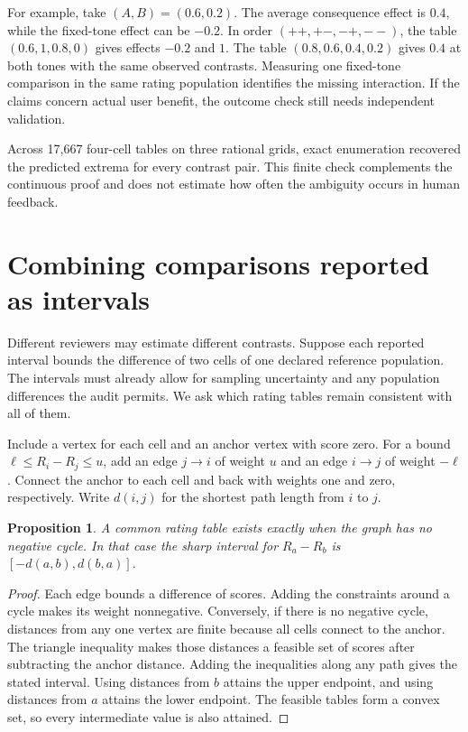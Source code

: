 \documentclass[11pt]{article}
\newtheorem{proposition}{Proposition}
\begin{document}
For example, take $(A,B)=(0.6,0.2)$. The average consequence
effect is $0.4$, while the fixed-tone effect can be $-0.2$.
In order $(++,+-,-+,--)$, the table $(0.6,1,0.8,0)$ gives
effects $-0.2$ and $1$. The table $(0.8,0.6,0.4,0.2)$ gives
$0.4$ at both tones with the same observed contrasts. Measuring
one fixed-tone comparison in the same rating population identifies
the missing interaction. If the claims concern actual user benefit,
the outcome check still needs independent validation.

Across 17,667 four-cell tables on three rational grids, exact
enumeration recovered the predicted extrema for every contrast
pair. This finite check complements the continuous proof and
does not estimate how often the ambiguity occurs in human feedback.

\section{Combining comparisons reported as intervals}
Different reviewers may estimate different contrasts. Suppose each
reported interval bounds the difference of two cells of one declared
reference population. The intervals must already allow for sampling
uncertainty and any population differences the audit permits. We
ask which rating tables remain consistent with all of them.

Include a vertex for each cell and an anchor vertex with score zero.
For a bound $\ell\le R_i-R_j\le u$, add an edge $j\to i$ of
weight $u$ and an edge $i\to j$ of weight $-\ell$. Connect the
anchor to each cell and back with weights one and zero, respectively.
Write $d(i,j)$ for the shortest path length from $i$ to $j$.

\begin{proposition}
A common rating table exists exactly when the graph has no negative
cycle. In that case the sharp interval for $R_a-R_b$ is
$[-d(a,b),d(b,a)]$.
\end{proposition}
\begin{proof}
Each edge bounds a difference of scores. Adding the constraints
around a cycle makes its weight nonnegative. Conversely, if there
is no negative cycle, distances from any one vertex are finite
because all cells connect to the anchor. The triangle inequality
makes those distances a feasible set of scores after subtracting
the anchor distance. Adding the inequalities along any path gives
the stated interval. Using distances from $b$ attains the upper
endpoint, and using distances from $a$ attains the lower endpoint.
The feasible tables form a convex set, so every intermediate
value is also attained.
\end{proof}
\end{document}
